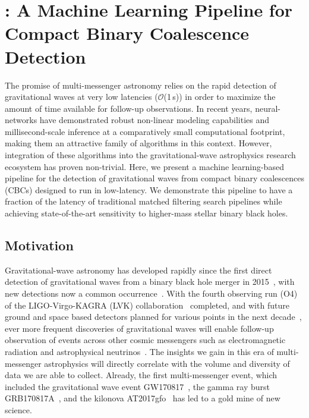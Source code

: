 \chapter{\aframe: A Machine Learning Pipeline for Compact Binary Coalescence Detection}
\label{chap:aframe_methods}

\begin{refsection}

The promise of multi-messenger astronomy relies on the rapid detection of gravitational waves at very low latencies ($\mathcal{O}$(1\,s)) in order to maximize the amount of time available for follow-up observations.
In recent years, neural-networks have demonstrated robust non-linear modeling capabilities and millisecond-scale inference at a comparatively small computational footprint, making them an attractive family of algorithms in this context.
However, integration of these algorithms into the gravitational-wave astrophysics research ecosystem has proven non-trivial.
Here, we present a machine learning-based pipeline for the detection of gravitational waves from compact binary coalescences (CBCs) designed to run in low-latency. 
We demonstrate this pipeline to have a fraction of the latency of traditional matched filtering search pipelines while achieving state-of-the-art sensitivity to higher-mass stellar binary black holes.


\section{Motivation} \label{aframe_meth_sec:intro}

Gravitational-wave astronomy has developed rapidly since the first direct detection of gravitational waves from a binary black hole merger in 2015~\cite{AbEA2016a}, with new detections now a common occurrence~\cite{Abbott_2023}.
With the fourth observing run (O4) of the LIGO-Virgo-KAGRA (LVK) collaboration~\cite{Aasi_2015, Acernese_2015, kagra} completed, and with future ground and space based detectors planned for various points in the next decade~\cite{PhysRevD.91.082001, Punturo_2010, LISA2000}, ever more frequent discoveries of gravitational waves will enable follow-up observation of events across other cosmic messengers such as electromagnetic radiation and astrophysical neutrinos~\cite{Tanvir_2013, Ascenzi_2019, Jin_2020, Rastinejad_2022, Albert_2023, Abbasi_2023}. 
The insights we gain in this era of multi-messenger astrophysics will directly correlate with the volume and diversity of data we are able to collect.
Already, the first multi-messenger event, which included the gravitational wave event GW170817~\cite{AbEA2017b}, the gamma ray burst GRB170817A~\cite{GoVe2017, SaFe2017, AbEA2017e}, and the kilonova AT2017gfo~\cite{CoFo2017, SmCh2017, AbEA2017f} has led to a gold mine of new science.


\end{refsection}
